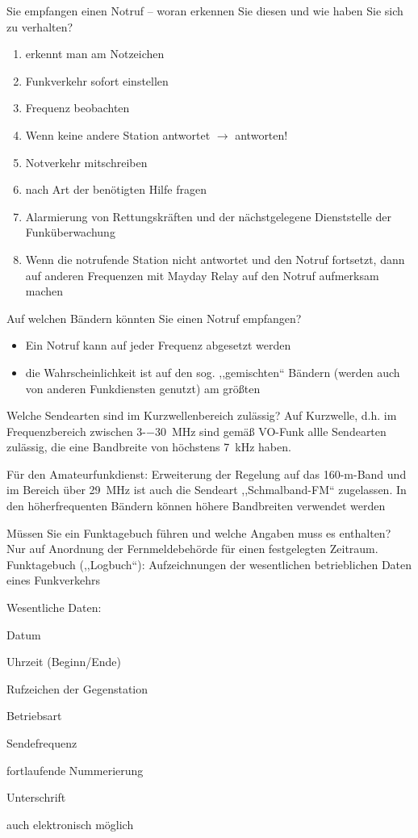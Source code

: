 \documentclass[avery5371,grid,frame,a4paper]{flashcards}
\newcommand{\card}[3]{
  \begin{flashcard}[{\chap} -- #1]{#2}#3\end{flashcard}
}
\begin{document}
\card{34}{Sie empfangen einen Notruf – woran erkennen Sie diesen und wie haben Sie sich zu verhalten?}{
  \footnotesize
  \begin{enumerate}\itemsep0pt
    \item erkennt man am Notzeichen
    \item Funkverkehr sofort einstellen
    \item Frequenz beobachten
    \item Wenn keine andere Station antwortet $\rightarrow$ antworten!
    \item Notverkehr mitschreiben
    \item nach Art der benötigten Hilfe fragen
    \item Alarmierung von Rettungskräften und der nächstgelegene Dienststelle der Funküberwachung
    \item Wenn die notrufende Station nicht antwortet und den Notruf fortsetzt, dann auf anderen Frequenzen mit Mayday Relay auf den Notruf aufmerksam machen
  \end{enumerate}
}
\card{35}{Auf welchen Bändern könnten Sie einen Notruf empfangen?}{
  \begin{itemize}
    \item Ein Notruf kann auf jeder Frequenz abgesetzt werden
    \item die Wahrscheinlichkeit ist auf den sog. ,,gemischten`` Bändern (werden auch von anderen Funkdiensten genutzt) am größten
  \end{itemize}
}
\card{36}{Welche Sendearten sind im Kurzwellenbereich zulässig?}{
  Auf Kurzwelle, d.h. im Frequenzbereich zwischen 3-\SI{-30}{\mega\Hz} sind gemäß VO-Funk allle Sendearten zulässig, die eine Bandbreite von höchstens \SI{7}{\kilo\Hz} haben.

  Für den Amateurfunkdienst: Erweiterung der Regelung auf das 160-m-Band und im Bereich über \SI{29}{\mega\Hz} ist auch die Sendeart ,,Schmalband-FM`` zugelassen. In den höherfrequenten Bändern können höhere Bandbreiten verwendet werden
}
\card{37}{Müssen Sie ein Funktagebuch führen und welche Angaben muss es enthalten?}{
  Nur auf Anordnung der Fernmeldebehörde für einen festgelegten Zeitraum.
  Funktagebuch (,,Logbuch``): Aufzeichnungen der wesentlichen betrieblichen Daten eines Funkverkehrs

  Wesentliche Daten:
  \begin{itemize*}
    \item Datum
    \item Uhrzeit (Beginn/Ende)
    \item Rufzeichen der Gegenstation
    \item Betriebsart
    \item Sendefrequenz
    \item fortlaufende Nummerierung
    \item Unterschrift
    \item auch elektronisch möglich
  \end{itemize*}
}
\end{document}

